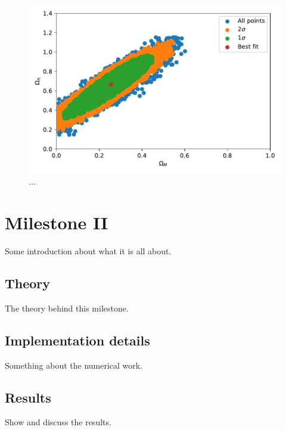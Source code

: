 \documentclass{aa}
\begin{document}
\begin{figure}[h!]
   \includegraphics[scale=0.5]{Figures/M1_confidence_area.pdf}
   \caption{...}\label{fig:M1_ca}
\end{figure}







\section{Milestone II}
Some introduction about what it is all about.

\subsection{Theory}
The theory behind this milestone.

\subsection{Implementation details}
Something about the numerical work.

\subsection{Results}
Show and discuss the results.
\end{document}
